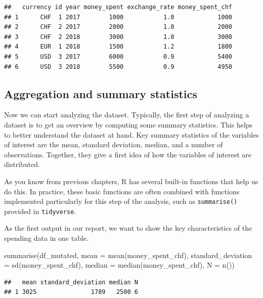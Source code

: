 \documentclass[
  12pt,
]{style/krantz}
\newenvironment{Shaded}{\begin{snugshade}}{\end{snugshade}}
\newcommand{\AttributeTok}[1]{\textcolor[rgb]{0.77,0.63,0.00}{#1}}
\newcommand{\FunctionTok}[1]{\textcolor[rgb]{0.00,0.00,0.00}{#1}}
\newcommand{\NormalTok}[1]{#1}
\begin{document}
\begin{verbatim}
##   currency id year money_spent exchange_rate money_spent_chf
## 1      CHF  1 2017        1000           1.0            1000
## 2      CHF  2 2017        2000           1.0            2000
## 3      CHF  2 2018        3000           1.0            3000
## 4      EUR  1 2018        1500           1.2            1800
## 5      USD  3 2017        6000           0.9            5400
## 6      USD  3 2018        5500           0.9            4950
\end{verbatim}

\hypertarget{aggregation-and-summary-statistics}{%
\subsection{Aggregation and summary statistics}\label{aggregation-and-summary-statistics}}

Now we can start analyzing the dataset. Typically, the first step of analyzing a dataset is to get an overview by computing some summary statistics. This helps to better understand the dataset at hand. Key summary statistics of the variables of interest are the mean, standard deviation, median, and a number of observations. Together, they give a first idea of how the variables of interest are distributed.

As you know from previous chapters, R has several built-in functions that help us do this. In practice, these basic functions are often combined with functions implemented particularly for this step of the analysis, such as \texttt{summarise()} provided in \texttt{tidyverse}.

As the first output in our report, we want to show the key characteristics of the spending data in one table.

\begin{Shaded}
\begin{Highlighting}[]
\FunctionTok{summarise}\NormalTok{(df\_mutated,}
          \AttributeTok{mean =} \FunctionTok{mean}\NormalTok{(money\_spent\_chf),}
          \AttributeTok{standard\_deviation =} \FunctionTok{sd}\NormalTok{(money\_spent\_chf),}
          \AttributeTok{median =} \FunctionTok{median}\NormalTok{(money\_spent\_chf),}
          \AttributeTok{N =} \FunctionTok{n}\NormalTok{())}
\end{Highlighting}
\end{Shaded}

\begin{verbatim}
##   mean standard_deviation median N
## 1 3025               1789   2500 6
\end{verbatim}
\end{document}
